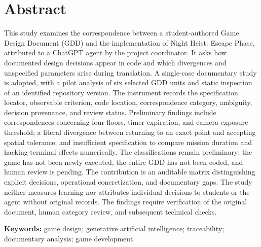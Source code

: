 \noindent\begin{minipage}{\linewidth}
\section*{\centering Abstract}
\begin{resumotexto}
This study examines the correspondence between a student-authored Game Design Document (GDD) and the implementation of Night Heist: Escape Phase, attributed to a ChatGPT agent by the project coordinator. It asks how documented design decisions appear in code and which divergences and unspecified parameters arise during translation. A single-case documentary study is adopted, with a pilot analysis of six selected GDD units and static inspection of an identified repository version. The instrument records the specification locator, observable criterion, code location, correspondence category, ambiguity, decision provenance, and review status. Preliminary findings include correspondences concerning four floors, timer expiration, and camera exposure threshold; a literal divergence between returning to an exact point and accepting spatial tolerance; and insufficient specification to compare mission duration and hacking-terminal effects numerically. The classifications remain preliminary: the game has not been newly executed, the entire GDD has not been coded, and human review is pending. The contribution is an auditable matrix distinguishing explicit decisions, operational concretization, and documentary gaps. The study neither measures learning nor attributes individual decisions to students or the agent without original records. The findings require verification of the original document, human category review, and subsequent technical checks.

\end{resumotexto}
\noindent\textbf{Keywords:} game design; generative artificial intelligence; traceability; documentary analysis; game development.
\end{minipage}
